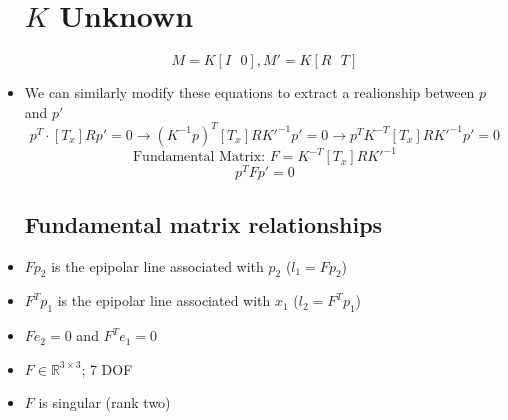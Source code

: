 \begin{itemize}
	\section{$K$ Unknown}
		$$M=K[I\text{ }0], M'=K[R\text{ }T]$$
	\item We can similarly modify these equations to extract a realionship between $p$ and $p'$
		$$p^T\cdot[T_x]Rp'=0\to(K^{-1}p)^T[T_x]RK'^{-1}p'=0\to p^TK^{-T}[T_x]RK'^{-1}p'=0$$
		$$\text{Fundamental Matrix: }F=K^{-T}[T_x]RK'^{-1}$$
		$$p^TFp'=0$$
	\subsection{Fundamental matrix relationships}
	\item $Fp_2$ is the epipolar line associated with $p_2$ ($l_1=Fp_2$)
	\item $F^Tp_1$ is the epipolar line associated with $x_1$ ($l_2=F^Tp_1$)
	\item $Fe_2=0$ and $F^Te_1=0$
	\item $F\in\mathbb{R}^{3\times 3}$; 7 DOF
	\item $F$ is singular (rank two)
\end{itemize}

